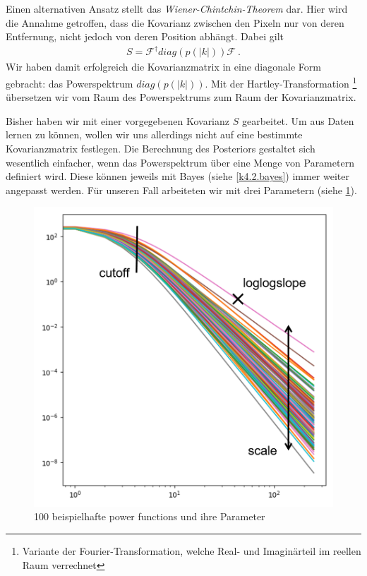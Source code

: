 Einen alternativen Ansatz stellt das \emph{Wiener-Chintchin-Theorem} dar. Hier wird die Annahme getroffen, dass die Kovarianz zwischen den Pixeln nur von deren Entfernung, nicht jedoch von deren Position abhängt. Dabei gilt
\begin{eqnarray}
S= \mathcal{F}^{\dagger} diag(p(|k|)) \mathcal{F} \ .
\end{eqnarray}
Wir haben damit erfolgreich die Kovarianzmatrix in eine diagonale Form gebracht: das Powerspektrum $diag(p(|k|))$. Mit der Hartley-Transformation \footnote{Variante der Fourier-Transformation, welche Real- und Imaginärteil im reellen Raum verrechnet} übersetzen wir vom Raum des Powerspektrums zum Raum der Kovarianzmatrix.

Bisher haben wir mit einer vorgegebenen Kovarianz $S$ gearbeitet. Um aus Daten lernen zu können, wollen wir uns allerdings nicht auf eine bestimmte Kovarianzmatrix festlegen. Die Berechnung des Posteriors gestaltet sich wesentlich einfacher, wenn das Powerspektrum über eine Menge von Parametern definiert wird. Diese können jeweils mit Bayes (siehe \cref{k4.2.bayes}) immer weiter angepasst werden. Für unseren Fall arbeiteten wir mit drei Parametern (siehe \cref{k4.2.power-function.img}).
\begin{figure}[htb] 
    \centering
    \includegraphics{k4.2/power_function_bearbeitet.png}
    \caption{100 beispielhafte power functions und ihre Parameter}
    \label{k4.2.power-function.img}
\end{figure}
